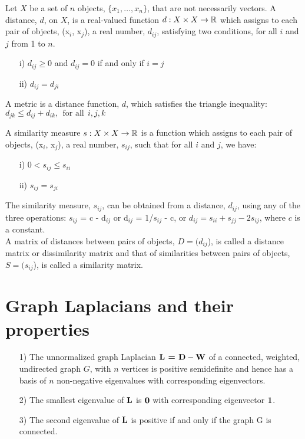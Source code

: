 \begin{Def}\label{distance}
Let $X$ be a set of $n$ objects, $\{x_{1}, \dots, x_{n}\}$, that are not necessarily vectors. A distance, $d$, on $X$, is a real-valued  function
$d: X \times X \rightarrow  \operatorname{\mathbb{R}}$ which assigns to each pair of objects, (x$_{i}$, x$_{j}$), a real number, $d_{ij}$, satisfying two conditions, for all $i$ and $j$ from 1 to $n$. 
\begin{itemize}
\item [i)] $d_{ij} \geq 0$ and $d_{ij} = 0$ if and only if $i=j$
\item [ii)] $d_{ij} = d_{ji}$
\end{itemize}
\end{Def}


A metric is a distance function, $d$, which satisfies the triangle inequality:
$d_{jk} \leq d_{ij} + d_{ik}, \ \ \text{for all}\ \ i,j,k$ 


\begin{Def}
A similarity measure $s: X \times X \rightarrow  \operatorname{\mathbb{R}}$ is a function which assigns to each pair of objects, (x$_{i}$, x$_{j}$), a real number, $s_{ij}$, such that
for all $i$ and $j$, we have:
\begin{itemize}
\item [i)]   $0 < s_{ij} \leq s_{ii}$ 
\item [ii)]  $s_{ij} = s_{ji}$
\end{itemize}
\end{Def}

The similarity measure, $s_{ij}$, can be obtained from a distance, $d_{ij}$, using any of the three operations: $s_{ij}$ = c - d$_{ij}$ or  d$_{ij}$ = 1/$s_{ij}$ - c, or $d_{ij} = s_{ii} + s_{jj} - 2s_{ij}$, where $c$ is a constant.\\

A matrix of distances between pairs of objects, $D = (d_{ij}$), is called a distance matrix or dissimilarity matrix and that of similarities between pairs of objects, $S = (s_{ij}$), is called a similarity matrix.


\section{Graph Laplacians and their properties} \label{graph laplacians}
\begin{itemize}
\item[1)] The unnormalized graph Laplacian $\textbf{L = D} - \textbf{W}$  of a connected, weighted,
undirected graph $G$, with $n$ vertices is positive semidefinite and hence 
has a basis of $n$ non-negative eigenvalues with corresponding  eigenvectors.
\item[2)] The smallest eigenvalue of $\textbf{L}$ is $\boldsymbol{0}$ with corresponding eigenvector $\boldsymbol{1}$. 
\item[3)]The second eigenvalue of $\textbf{L}$ is positive if and only if the graph G is connected.
\end{itemize}


